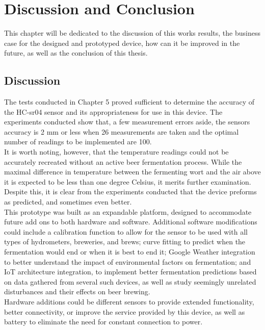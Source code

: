 \documentclass[twoside]{ctuthesis}
\theoremstyle{plain}
\theoremstyle{definition}
\theoremstyle{note}
\begin{document}
\pagebreak

\begingroup
\renewcommand{\cleardoublepage}{}
\renewcommand{\clearpage}{}
\chapter{Discussion and Conclusion}
\endgroup
This chapter will be dedicated to the discussion of this works results, the business case for the designed and prototyped device, how can it be improved in the future, as well as the conclusion of this thesis.

\section{Discussion}
The tests conducted in Chapter 5 proved sufficient to determine the accuracy of the HC-sr04 sensor and its appropriateness for use in this device.	The experiments conducted show that, a few measurement errors aside, the sensors accuracy is 2 mm or less when 26 measurements are taken and the optimal number of readings to be implemented are 100.\\
It is worth noting, however, that the temperature readings could not be accurately recreated without an active beer fermentation process. While the maximal difference in temperature between the fermenting wort and the air above it is expected to be less than one degree Celsius\cite{Thermodynamics_Brewers}, it merits further examination. Despite this, it is clear from the experiments conducted that the device preforms as predicted, and sometimes even better.\\
This prototype was built as an expandable platform, designed to accommodate future add ons to both hardware and software. Additional software modifications could include a calibration function to allow for the sensor to be used with all types of hydrometers, breweries, and brews; curve fitting to predict when the fermentation would end or when it is best to end it; Google Weather integration to better understand the impact of environmental factors on fermentation; and IoT architecture integration, to implement better fermentation predictions based on data gathered from several such devices, as well as study seemingly unrelated disturbances and their effects on beer brewing.\\
Hardware additions could be different sensors to provide extended functionality, better connectivity, or improve the service provided by this device, as well as battery to eliminate the need for constant connection to power.
\end{document}
